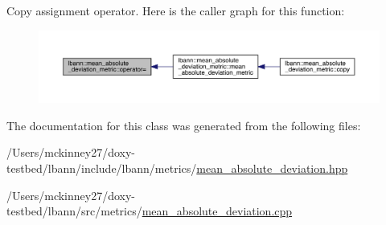 Copy assignment operator. Here is the caller graph for this function\+:\nopagebreak
\begin{figure}[H]
\begin{center}
\leavevmode
\includegraphics[width=350pt]{classlbann_1_1mean__absolute__deviation__metric_a7424749c8ab06a2126485c9dba202b8f_icgraph}
\end{center}
\end{figure}


The documentation for this class was generated from the following files\+:\begin{DoxyCompactItemize}
\item 
/\+Users/mckinney27/doxy-\/testbed/lbann/include/lbann/metrics/\hyperlink{metrics_2mean__absolute__deviation_8hpp}{mean\+\_\+absolute\+\_\+deviation.\+hpp}\item 
/\+Users/mckinney27/doxy-\/testbed/lbann/src/metrics/\hyperlink{metrics_2mean__absolute__deviation_8cpp}{mean\+\_\+absolute\+\_\+deviation.\+cpp}\end{DoxyCompactItemize}

